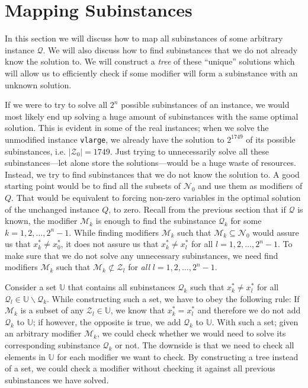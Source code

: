 \section{Mapping Subinstances}
In this section we will discuss how to map all subinstances of some arbitrary
instance $\mathcal{Q}$. We will also discuss how to find 
subinstances that we do not already know the solution to.
We will construct a \emph{tree} of these ``unique'' solutions which will allow
us to efficiently check if some modifier will form a subinstance with an
unknown solution.

If we were to try to solve all $2^n$ possible subinstances of an
instance, we would most likely end up solving a huge amount of subinstances
with the same optimal solution. This is evident in some of the real
instances; when we solve the unmodified instance \texttt{vlarge}, we already
have the solution to $2^{1749}$ of its possible subinstances, i.e.
$|\mathcal{Z}_0| = 1749$.
Just trying to unnecessarily solve all these subinstances---let alone store the
solutions---would be a huge waste of resources.
Instead, we try to find subinstances that we do not know the solution to.
A good starting point would be to find all the subsets of $\mathcal{N}_0$ and
use them as modifiers of $Q$. That would be equivalent to forcing non-zero
variables in the optimal solution of the unchanged instance $Q$, to zero.
Recall from the previous section that if $\mathcal{Q}$ is known, the modifier
$\mathcal{M}_k$ is enough to find the subinstance $\mathcal{Q}_k$ for some
$k=1,2,\ldots,2^n-1$.
While finding modifiers $\mathcal{M}_k$ such that
$\mathcal{M}_k \subseteq \mathcal{N}_0$ would assure us that $x_k^*\neq x_0^*$,
it does not assure us that $x_k^* \neq x_l^*$ for all $l=1,2,\ldots,2^n-1$.
To make sure that we do not solve any unnecessary subinstances, we need
find modifiers $\mathcal{M}_k$ such that
$\mathcal{M}_k \not \subset \mathcal{Z}_l$
for \emph{all} $l=1,2,\ldots,2^n-1$.

Consider a set $\mathbb{U}$ that contains all subinstances $\mathcal{Q}_k$
such that $x_k^* \neq x_l^*$ for all
$\mathcal{Q}_l \in \mathbb{U} \backslash \mathcal{Q}_k$.
While constructing such a set, we have to obey the following rule:
If $\mathcal{M}_k$ is a subset of any $\mathcal{Z}_l \in \mathbb{U}$, we know
that $x_k^* = x_l^*$ and therefore we do not add $\mathcal{Q}_k$ to
$\mathbb{U}$;
if however, the opposite is true, we add $\mathcal{Q}_k$ to $\mathbb{U}$.
With such a set; given an arbitrary modifier $\mathcal{M}_k$, we could check
whether we would need to solve its corresponding subinstance $\mathcal{Q}_k$ or
not.
The downside is that we need to check all elements in $\mathbb{U}$ for
each modifier we want to check.
By constructing a tree instead of a set, we could check a modifier without
checking it against all previous subinstances we have solved.


